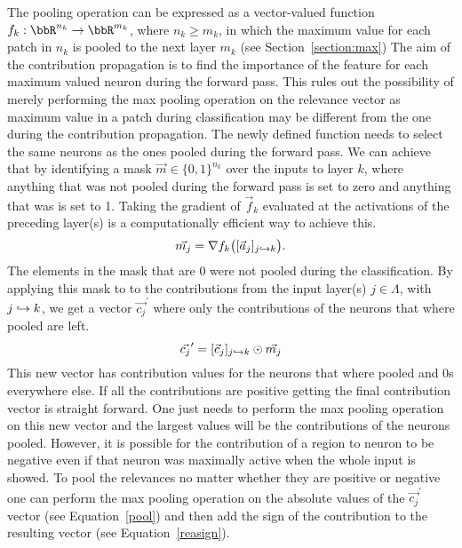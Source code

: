 \newline
\newline
The pooling operation can be expressed as a vector-valued function $f_k:\bbR^{n_k}\to\bbR^{m_k}$, where $n_k \geq m_k$, in which the maximum value for each patch in $n_k$ is pooled to the next layer $m_k$  (see Section~\ref{section:max})
\newline
\newline
The aim of the contribution propagation is to find the importance of the feature for each maximum valued neuron during the forward pass. This rules out the possibility of merely performing the max pooling operation on the relevance vector as maximum value in a patch during classification may be different from the one during the contribution propagation. The newly defined function needs to select the same neurons as the ones pooled during the forward pass.
\newline
\newline
We can achieve that by identifying a mask $\vec{m}\in \{0,1\}^{n_k}$ over the inputs to layer $k$, where anything that was not pooled during the forward pass is set to zero and anything that was is set to 1. Taking the gradient of $\vec{f}_k$ evaluated at the activations of the preceding layer(s) is a computationally efficient way to achieve this.
\begin{equation}
    \vec{m_j} = \nabla f_k\big([\vec{a}_j]_{j\hookrightarrow k}\big).
\end{equation}
The elements in the mask that are $0$ were not pooled during the classification. By applying this mask to to the contributions from the input layer(s) $j\in \Lambda$, with $j\hookrightarrow k$, we get a vector $\vec{c_j}^\prime$ where only the contributions of the neurons that where pooled are left.
\begin{equation}
    \vec{c_j}^\prime = [\vec{c}_{j}]_{j\hookrightarrow k} \odot \vec{m_j}
\end{equation}
This new vector has contribution values for the neurons that where pooled and 0s everywhere else. If all the contributions are positive getting the final contribution vector is straight forward. One just needs to perform the max pooling operation on this new vector and the largest values will be the contributions of the neurons pooled. However, it is possible for the contribution of a region to  neuron to be negative even if that neuron was maximally active when the whole input is showed.
\newline
\newline
To pool the relevances no matter whether they are positive or negative one can perform the max pooling operation on the absolute values of the $\vec{c_j}^\prime$ vector (see Equation~\ref{pool}) and then add the sign of the contribution to the resulting vector (see Equation~\ref{reasign}).
